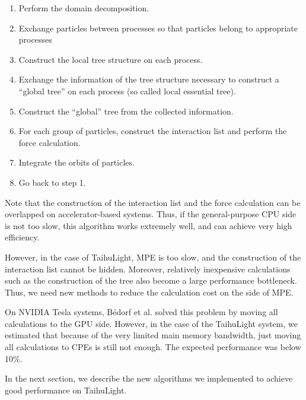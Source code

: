\documentclass[oribibl]{llncs}
\begin{document}
\begin{enumerate}

\item Perform the domain decomposition.
  
\item Exchange particles between processes so that particles belong to
  appropriate processes
  
\item Construct the local tree structure on each process.

\item Exchange the information of the tree structure necessary to
  construct a ``global tree'' on each process (so called local
  essential tree).
  
\item Construct the ``global'' tree from the collected information.

\item For each group of particles, construct the interaction list and
  perform the force calculation.
  
\item Integrate the orbits of particles.

\item Go back to step 1.
  
\end{enumerate}

Note that the construction of the interaction list and the force
calculation can be overlapped on accelerator-based systems. Thus, if
the general-purpose CPU side is not too slow, this algorithm works
extremely well, and can achieve very high efficiency.

However, in the case of TaihuLight, MPE is too slow, and the
construction of the interaction list cannot be hidden. Moreover,
relatively inexpensive calculations such as the construction of the
tree also become a large performance bottleneck. Thus, we need new
methods to reduce the calculation cost on the side of MPE.

On NVIDIA Tesla systems, B{\'e}dorf et al. \cite{2014hpcn.conf...54B}
solved this problem by moving all calculations to the GPU side.
However, in the case of the TaihuLight system, we estimated that because
of the very limited main memory bandwidth, just moving all
calculations to CPEs is still not enough. The expected performance was
below 10\%.

In the next section, we describe the new algorithms we implemented to
achieve good performance on TaihuLight.
\end{document}
